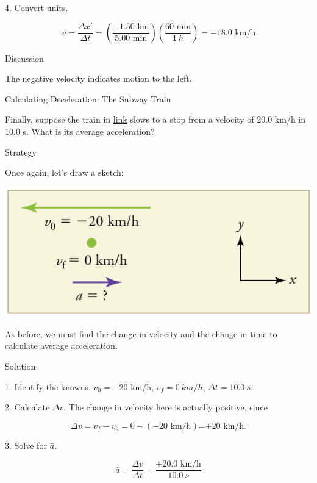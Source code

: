 \documentclass[
]{book}
\begin{document}
4. Convert units.

\leavevmode{}%
\[{{\overset{-}{v} = \frac{\Delta x\prime}{\Delta t}} = \left( \frac{{- 1}\text{.}\text{50\ km}}{5\text{.}\text{00\ min}} \right)}{\left( \frac{\text{60\ min}}{1\ h} \right) = {- \text{18}}}\text{.0\ km/h}\]

{Discussion}

The negative velocity indicates motion to the left.

\hypertarget{fs-id4015260}{}
Calculating Deceleration: The Subway Train

Finally, suppose the train in
\protect\hyperlink{import-auto-id2412190}{link} slows to a stop
from a velocity of 20.0 km/h in 10.0 s. What is its average
acceleration?

{Strategy}

Once again, let's draw a sketch:

\includegraphics{images/Figure_02_03_04b.jpg}

As before, we must find the change in velocity and the change in time to
calculate average acceleration.

{Solution}

1. Identify the knowns. \(v_{0} = {- \text{20\ km/h}}\),
\(v_{f} = 0\ km/h\), \({{\Delta t = \text{10}}\text{.}0\ s}{}\).

2. Calculate \({\Delta v}{}\). The change in velocity here is actually
positive, since

\leavevmode{}%
\[{{{{\Delta v = {v_{f} - v_{0}}} = {0 - \left( {- \text{20\ km/h}} \right)}}\text{=}\text{+}\text{20\ km/h}}.}{}\]

3. Solve for \(\overset{-}{a}{}\).

\leavevmode{}%
\[{\overset{-}{a} = \frac{\Delta v}{\Delta t}} = \frac{{+ \text{20}}\text{.0\ km/h}}{\text{10}\text{.}0\ s}\]
\end{document}
